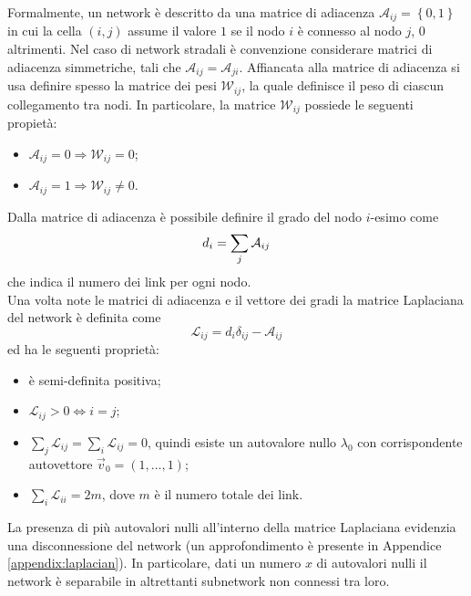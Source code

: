 Formalmente, un network \`e descritto da una matrice di adiacenza $\mathcal{A}_{ij}=\left\{0,1\right\}$ in cui la cella $(i,j)$ assume il valore $1$ se il nodo $i$ \`e connesso al nodo $j$, $0$ altrimenti.
Nel caso di network stradali \`e convenzione considerare matrici di adiacenza simmetriche, tali che $\mathcal{A}_{ij}=\mathcal{A}_{ji}$.
Affiancata alla matrice di adiacenza si usa definire spesso la matrice dei pesi $\mathcal{W}_{ij}$, la quale definisce il peso di ciascun collegamento tra nodi.
In particolare, la matrice $\mathcal{W}_{ij}$ possiede le seguenti propiet\`a:
\begin{itemize}
    \item $\mathcal{A}_{ij} = 0 \Longrightarrow \mathcal{W}_{ij} = 0$;
    \item $\mathcal{A}_{ij} = 1 \Longrightarrow \mathcal{W}_{ij} \neq 0$.
\end{itemize}
Dalla matrice di adiacenza \`e possibile definire il grado del nodo $i$-esimo come
\begin{equation*}
    d_i=\sum_j\mathcal{A}_{ij}\\
\end{equation*}
che indica il numero dei link per ogni nodo.
\\Una volta note le matrici di adiacenza e il vettore dei gradi la matrice Laplaciana del network \`e definita come
\begin{equation}
    \mathcal{L}_{ij}=d_i\delta_{ij}-\mathcal{A}_{ij}
\end{equation}
ed ha le seguenti propriet\`a:
\begin{itemize}
    \item \`e semi-definita positiva;
    \item $\mathcal{L}_{ij}>0\Longleftrightarrow i=j$;
    \item $\sum_j\mathcal{L}_{ij}=\sum_i\mathcal{L}_{ij}=0$, quindi esiste un autovalore nullo $\lambda_0$ con corrispondente autovettore $\vec{v}_0=(1,\ldots,1)$;
    \item $\sum_i\mathcal{L}_{ii}=2m$, dove $m$ \`e il numero totale dei link.
\end{itemize}
La presenza di pi\`u autovalori nulli all'interno della matrice Laplaciana evidenzia una disconnessione del network (un approfondimento \`e presente in Appendice \ref{appendix:laplacian}).
In particolare, dati un numero $x$ di autovalori nulli il network \`e separabile in altrettanti subnetwork non connessi tra loro.
